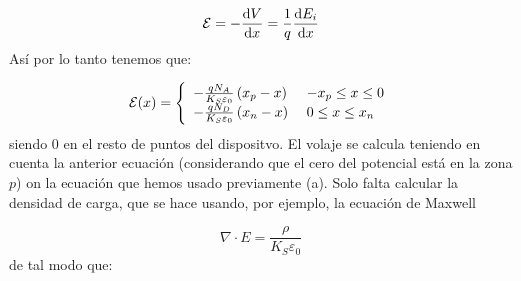 \begin{enumerate}[label=\alph*)]
    \begin{equation}
        \mathcal{E} = - \frac{\mathrm{d} V}{\mathrm{d} x} = \frac{1}{q} \frac{\mathrm{d} E_i}{\mathrm{d} x}
    \end{equation}
    Así por lo tanto tenemos que: 

    \begin{equation*}
        \Ecal(x) = \left\lbrace \begin{array}{ll}
            - \frac{qN_A}{K_S\varepsilon_0} \parentesis{x_p - x}  & \ - x_p \leq x \leq 0 \\
            - \frac{qN_D}{K_S\varepsilon_0} \parentesis{x_n - x} & \ 0 \leq x \leq x_n \\
        \end{array} \right.
    \end{equation*}
    siendo 0 en el resto de puntos del dispositvo. El volaje se calcula teniendo en cuenta la anterior ecuación (considerando que el cero del potencial está en la zona $p$) on la ecuación que hemos usado previamente (a). Solo falta calcular la densidad de carga, que se hace usando, por ejemplo, la ecuación de Maxwell

    \begin{equation}
        \nabla \cdot E = \frac{\rho}{K_S \varepsilon_0} 
    \end{equation}
    de tal modo que:


\end{enumerate}
